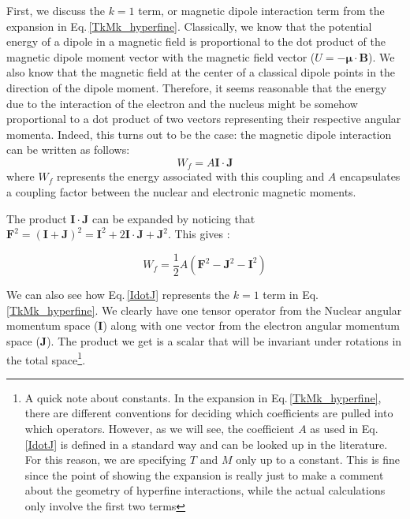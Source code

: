 First, we discuss the $k=1$ term, or magnetic dipole interaction term from the expansion in Eq.\,\ref{TkMk_hyperfine}. Classically, we know that the potential energy of a dipole in a magnetic field is proportional to the dot product of the magnetic dipole moment vector with the magnetic field vector ($U=-\mathbf{\mu}\cdot\mathbf{B}$). We also know that the magnetic field at the center of a classical dipole points in the direction of the dipole moment. Therefore, it seems reasonable that the energy due to the interaction of the electron and the nucleus might be somehow proportional to a dot product of two vectors representing their respective angular momenta. Indeed, this turns out to be the case: the magnetic dipole interaction can be written as follows\cite{sobelman_spectra}: 
\begin{equation}\label{IdotJ}
W_f=A\mathbf{I}\cdot\mathbf{J}
\end{equation}
where $W_f$ represents the energy associated with this coupling and $A$ encapsulates a coupling factor between the nuclear and electronic magnetic moments. 

The product $\mathbf{I}\cdot\mathbf{J}$ can be expanded by noticing that $\mathbf{F}^2=(\mathbf{I}+\mathbf{J})^2=\mathbf{I}^2+2 \mathbf{I}\cdot\mathbf{J}+\mathbf{J}^2$. This gives \cite{cuaMITnotes}\cite{sobelman_spectra}: 

\begin{equation}\label{Wf_dot_product}
W_f=\frac{1}{2}A(\mathbf{F}^2-\mathbf{J}^2-\mathbf{I}^2)
\end{equation}

We can also see how Eq.\,\ref{IdotJ} represents the $k=1$ term in Eq.\,\ref{TkMk_hyperfine}. We clearly have one tensor operator from the Nuclear angular momentum space ($\mathbf{I}$) along with one vector from the electron angular momentum space ($\mathbf{J}$). The product we get is a scalar that will be invariant under rotations in the total space\footnote{A quick note about constants. In the expansion in Eq.\,\ref{TkMk_hyperfine}, there are different conventions \cite{schwartz_hyperfine_expansion} for deciding which coefficients are pulled into which operators. However, as we will see, the coefficient $A$ as used in Eq.\,\ref{IdotJ} is defined in a standard way and can be looked up in the literature. For this reason, we are specifying $T$ and $M$ only up to a constant. This is fine since the point of showing the expansion is really just to make a comment about the geometry of hyperfine interactions, while the actual calculations only involve the first two terms}.

